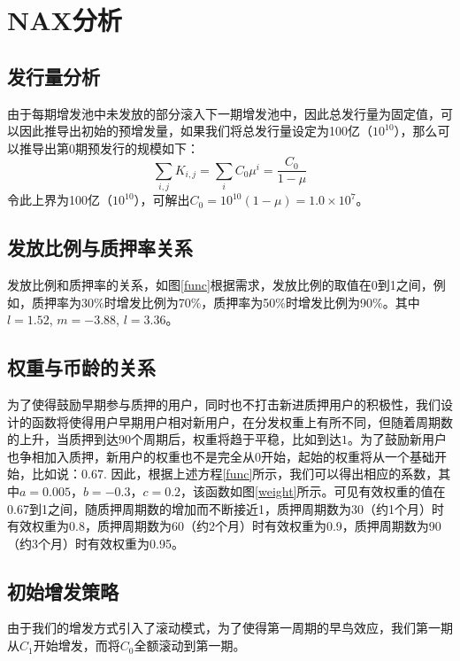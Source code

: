 \section{NAX分析}
\subsection{发行量分析}
由于每期增发池中未发放的部分滚入下一期增发池中，因此总发行量为固定值，可以因此推导出初始的预增发量，如果我们将总发行量设定为100亿（\(10^{10}\)），那么可以推导出第0期预发行的规模如下：
\begin{equation}
  \sum_{i,j} K_{i,j} = \sum_i C_0 \mu^i = \frac{C_0}{1-\mu}
\end{equation}
  令此上界为100亿（\(10^{10}\)），可解出\(C_0 = 10^{10}(1-\mu) = 1.0\times10^7\)。

\subsection{发放比例与质押率关系}
发放比例和质押率的关系，如图\ref{func}根据需求，发放比例的取值在0到1之间，例如，质押率为30\%时增发比例为70\%，质押率为50\%时增发比例为90\%。其中\(l=1.52\), \(m=-3.88\), \(l=3.36\)。

\subsection{权重与币龄的关系}
为了使得鼓励早期参与质押的用户，同时也不打击新进质押用户的积极性，我们设计的函数将使得用户早期用户相对新用户，在分发权重上有所不同，但随着周期数的上升，当质押到达90个周期后，权重将趋于平稳，比如到达$1$。为了鼓励新用户也争相加入质押，新用户的权重也不是完全从0开始，起始的权重将从一个基础开始，比如说：$0.67$. 因此，根据上述方程\ref{func}所示，我们可以得出相应的系数，其中\(a=0.005\)，\(b=-0.3\)，\(c=0.2\)，该函数如图\ref{weight}所示。可见有效权重的值在0.67到1之间，随质押周期数的增加而不断接近1，质押周期数为30（约1个月）时有效权重为0.8，质押周期数为60（约2个月）时有效权重为0.9，质押周期数为90（约3个月）时有效权重为0.95。

\subsection{初始增发策略}
由于我们的增发方式引入了滚动模式，为了使得第一周期的早鸟效应，我们第一期从$C_1$开始增发，而将$C_0$全额滚动到第一期。
